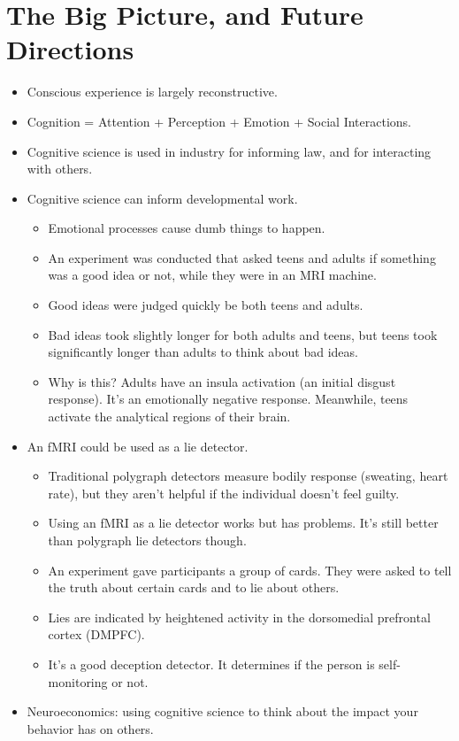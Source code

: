 \documentclass[]{article}
\begin{document}
	\section{The Big Picture, and Future Directions}
		\begin{itemize}
			\item Conscious experience is largely reconstructive.
			\item Cognition = Attention + Perception + Emotion + Social Interactions.
			\item Cognitive science is used in industry for informing law, and for interacting with others.
			\item Cognitive science can inform developmental work.
				\begin{itemize}
					\item Emotional processes cause dumb things to happen.
					\item An experiment was conducted that asked teens and adults if something was a good idea or not, while they were in an MRI machine.
					\item Good ideas were judged quickly be both teens and adults.
					\item Bad ideas took slightly longer for both adults and teens, but teens took significantly longer than adults to think about bad ideas.
					\item Why is this? Adults have an insula activation (an initial disgust response). It's an emotionally negative response. Meanwhile, teens activate the analytical regions of their brain.
				\end{itemize}

			\item An fMRI could be used as a lie detector.
				\begin{itemize}
					\item Traditional polygraph detectors measure bodily response (sweating, heart rate), but they aren't helpful if the individual doesn't feel guilty.
					\item Using an fMRI as a lie detector works but has problems. It's still better than polygraph lie detectors though.
					\item An experiment gave participants a group of cards. They were asked to tell the truth about certain cards and to lie about others.
					\item Lies are indicated by heightened activity in the dorsomedial prefrontal cortex (DMPFC).
					\item It's a good deception detector. It determines if the person is self-monitoring or not.
				\end{itemize}

			\item Neuroeconomics: using cognitive science to think about the impact your behavior has on others.
		\end{itemize}
\end{document}
